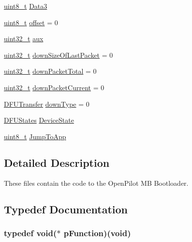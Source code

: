 \begin{DoxyCompactItemize}
\item 
\hyperlink{stdint_8h_aba7bc1797add20fe3efdf37ced1182c5}{uint8\-\_\-t} \hyperlink{group___open_pilot_b_l_gad720a618b65381cfa7001818902cc1af}{Data3}
\item 
\hyperlink{stdint_8h_aba7bc1797add20fe3efdf37ced1182c5}{uint8\-\_\-t} \hyperlink{group___open_pilot_b_l_gaa9fff43968831437a312428836cab362}{offset} = 0
\item 
\hyperlink{stdint_8h_a435d1572bf3f880d55459d9805097f62}{uint32\-\_\-t} \hyperlink{group___open_pilot_b_l_gac9bbabaf2ae72f5c475d939d06b3d9d1}{aux}
\item 
\hyperlink{stdint_8h_a435d1572bf3f880d55459d9805097f62}{uint32\-\_\-t} \hyperlink{group___open_pilot_b_l_ga82229f66c307f3b4e51c7bd613d65eb4}{down\-Size\-Of\-Last\-Packet} = 0
\item 
\hyperlink{stdint_8h_a435d1572bf3f880d55459d9805097f62}{uint32\-\_\-t} \hyperlink{group___open_pilot_b_l_gaa0f5e0ae7b6b9c1c7aa32e606fae3652}{down\-Packet\-Total} = 0
\item 
\hyperlink{stdint_8h_a435d1572bf3f880d55459d9805097f62}{uint32\-\_\-t} \hyperlink{group___open_pilot_b_l_ga5125fe846a539f8e8a71d9a21a1b4d4d}{down\-Packet\-Current} = 0
\item 
\hyperlink{group___copter_control_b_l_ga0b23a3b03386f81782f1b57b69804064}{D\-F\-U\-Transfer} \hyperlink{group___open_pilot_b_l_ga51d987c86e99fb64184b4b90a57ff360}{down\-Type} = 0
\item 
\hyperlink{group___copter_control_b_l_ga9a9e510f2da4e725074c7191d9d75d37}{D\-F\-U\-States} \hyperlink{group___open_pilot_b_l_ga342208ed1954c6486eac389edf7c7f86}{Device\-State}
\item 
\hyperlink{stdint_8h_aba7bc1797add20fe3efdf37ced1182c5}{uint8\-\_\-t} \hyperlink{group___open_pilot_b_l_ga6c435d21e1e77b6e71943e6ecac43154}{Jump\-To\-App}
\end{DoxyCompactItemize}


\subsection{Detailed Description}
These files contain the code to the Open\-Pilot M\-B Bootloader. 

\subsection{Typedef Documentation}
\hypertarget{group___open_pilot_b_l_ga9227bf1f1a9c633a0cc9ca50cc761c1a}{
\subsubsection[{p\-Function}]{\setlength{\rightskip}{0pt plus 5cm}typedef {\bf void}($\ast$ p\-Function)({\bf void})}}\label{group___open_pilot_b_l_ga9227bf1f1a9c633a0cc9ca50cc761c1a}


